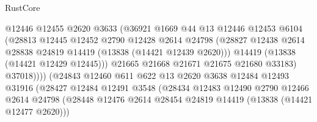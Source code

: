 \begin{lexlean}{RustCore}
\begin{coremodule}
                                  @12446
                                  @12455
                                  @2620
                                  @3633
                                  (@36921
                                    @1669
                                    @44
                                    @13
                                    @12446
                                    @12453
                                    @6104
                                    (@28813
                                      @12445
                                      @12452
                                      @2790
                                      @12428
                                      @2614
                                      @24798
                                      (@28827
                                        @12438
                                        @2614
                                        @28838
                                        @24819
                                        @14419
                                        (@13838 (@14421 @12439 @2620)))
                                      @14419
                                      (@13838 (@14421 @12429 @12445)))
                                    @21665
                                    @21668
                                    @21671
                                    @21675
                                    @21680
                                    @33183)
                                  @37018))))
                          (@24843
                            @12460
                            @611
                            @622
                            @13
                            @2620
                            @3638
                            @12484
                            @12493
                            @31916
                            (@28427
                              @12484
                              @12491
                              @3548
                              (@28434
                                @12483
                                @12490
                                @2790
                                @12466
                                @2614
                                @24798
                                (@28448
                                  @12476
                                  @2614
                                  @28454
                                  @24819
                                  @14419
                                  (@13838 (@14421 @12477 @2620)))

\end{coremodule}
\end{lexlean}
